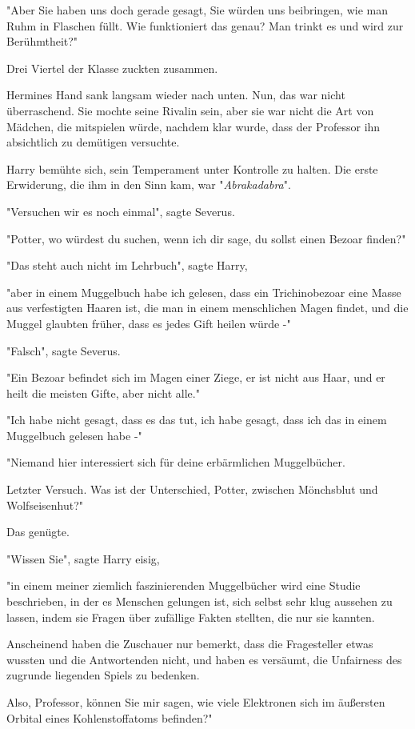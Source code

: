 {"Aber Sie haben uns doch gerade gesagt, Sie würden uns beibringen, wie man Ruhm in Flaschen füllt. Wie funktioniert das genau? Man trinkt es und wird zur Berühmtheit?"

Drei Viertel der Klasse zuckten zusammen.

Hermines Hand sank langsam wieder nach unten. Nun, das war nicht überraschend. Sie mochte seine Rivalin sein, aber sie war nicht die Art von Mädchen, die mitspielen würde, nachdem klar wurde, dass der Professor ihn absichtlich zu demütigen versuchte.

Harry bemühte sich, sein Temperament unter Kontrolle zu halten. Die erste Erwiderung, die ihm in den Sinn kam, war "\emph{Abrakadabra}".

"Versuchen wir es noch einmal", sagte Severus.

"Potter, wo würdest du suchen, wenn ich dir sage, du sollst einen Bezoar finden?"

"Das steht auch nicht im Lehrbuch", sagte Harry,

"aber in einem Muggelbuch habe ich gelesen, dass ein Trichinobezoar eine Masse aus verfestigten Haaren ist, die man in einem menschlichen Magen findet, und die Muggel glaubten früher, dass es jedes Gift heilen würde -"

"Falsch", sagte Severus.

"Ein Bezoar befindet sich im Magen einer Ziege, er ist nicht aus Haar, und er heilt die meisten Gifte, aber nicht alle."

"Ich habe nicht gesagt, dass es das tut, ich habe gesagt, dass ich das in einem Muggelbuch gelesen habe -"

"Niemand hier interessiert sich für deine erbärmlichen Muggelbücher.

Letzter Versuch. Was ist der Unterschied, Potter, zwischen Mönchsblut und Wolfseisenhut?"

Das genügte.

"Wissen Sie", sagte Harry eisig,

"in einem meiner ziemlich faszinierenden Muggelbücher wird eine Studie beschrieben, in der es Menschen gelungen ist, sich selbst sehr klug aussehen zu lassen, indem sie Fragen über zufällige Fakten stellten, die nur sie kannten.

Anscheinend haben die Zuschauer nur bemerkt, dass die Fragesteller etwas wussten und die Antwortenden nicht, und haben es versäumt, die Unfairness des zugrunde liegenden Spiels zu bedenken.

Also, Professor, können Sie mir sagen, wie viele Elektronen sich im äußersten Orbital eines Kohlenstoffatoms befinden?"

}
